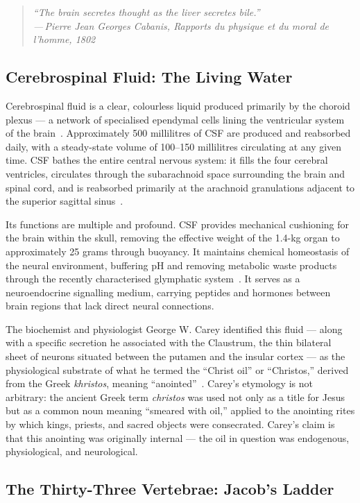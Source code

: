 \documentclass[12pt, a4paper]{article}
\newcommand{\epigraph}[2]{%
  \begin{quote}
    \itshape ``#1''\\[0.3em]
    \normalfont\small\hfill ---\,#2
  \end{quote}
}
\begin{document}
\epigraph{The brain secretes thought as the liver secretes bile.}{Pierre Jean
Georges Cabanis, \emph{Rapports du physique et du moral de l'homme}, 1802}

\subsection{Cerebrospinal Fluid: The Living Water}

Cerebrospinal fluid is a clear, colourless liquid produced primarily by the
choroid plexus — a network of specialised ependymal cells lining the
ventricular system of the brain~\autocite[1289]{gray2016}. Approximately 500
millilitres of CSF are produced and reabsorbed daily, with a steady-state
volume of 100--150 millilitres circulating at any given time. CSF bathes the
entire central nervous system: it fills the four cerebral ventricles,
circulates through the subarachnoid space surrounding the brain and spinal
cord, and is reabsorbed primarily at the arachnoid granulations adjacent to
the superior sagittal sinus~\autocite{knie2018}.

Its functions are multiple and profound. CSF provides mechanical cushioning
for the brain within the skull, removing the effective weight of the 1.4-kg
organ to approximately 25 grams through buoyancy. It maintains chemical
homeostasis of the neural environment, buffering pH and removing metabolic
waste products through the recently characterised glymphatic
system~\autocite[1291]{gray2016}. It serves as a neuroendocrine signalling
medium, carrying peptides and hormones between brain regions that lack direct
neural connections.

The biochemist and physiologist George W. Carey identified this fluid — along
with a specific secretion he associated with the Claustrum, the thin bilateral
sheet of neurons situated between the putamen and the insular cortex — as the
physiological substrate of what he termed the ``Christ oil'' or ``Christos,''
derived from the Greek \emph{khristos}, meaning ``anointed''~\autocite{carey1920}.
Carey's etymology is not arbitrary: the ancient Greek term \emph{christos} was
used not only as a title for Jesus but as a common noun meaning ``smeared with
oil,'' applied to the anointing rites by which kings, priests, and sacred
objects were consecrated. Carey's claim is that this anointing was originally
internal — the oil in question was endogenous, physiological, and
neurological.

\subsection{The Thirty-Three Vertebrae: Jacob's Ladder}
\end{document}
